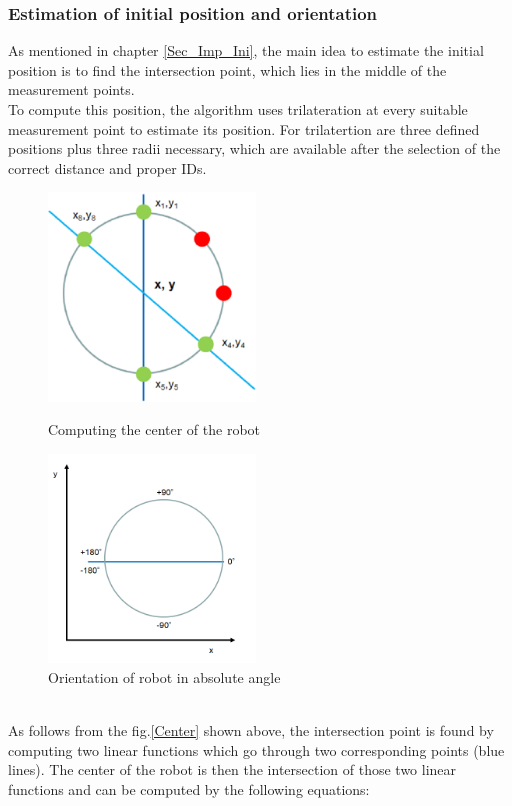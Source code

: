 \subsubsection{Estimation of initial position and orientation}
As mentioned in chapter \ref{Sec_Imp_Ini}, the main idea to estimate the initial position is to find the intersection point, which lies in the middle of the measurement points.\\
To compute this position, the algorithm uses trilateration at every suitable measurement point to estimate its position. For trilatertion are three defined positions plus three radii necessary, which are available after the selection of the correct distance and proper IDs.\\
\begin{figure}[!htbp]
\centering
\begin{minipage}{.5\textwidth}
\centering
\includegraphics[width=5.5cm]{Pictures/Center_Rob} %
\caption{Computing the center of the robot}
\label{Center}
\end{minipage}%
\begin{minipage}{.5\textwidth}
\centering
\includegraphics[width=5.5cm]{Pictures/Orientation} %
\caption{Orientation of robot in absolute angle}
\label{Angle}
\end{minipage}
\end{figure}\\
As follows from the fig.\ref{Center} shown above, the intersection point is found by computing two linear functions which go through two corresponding points (blue lines). The center of the robot is then the intersection of those two linear functions and can be computed by the following equations:
